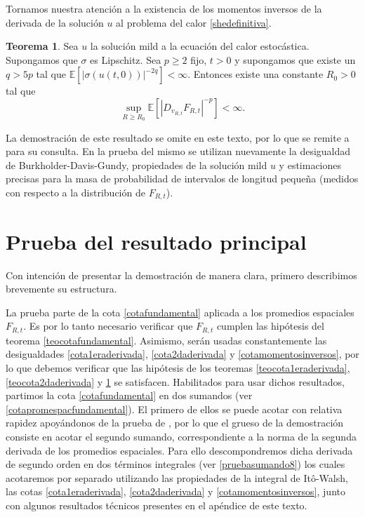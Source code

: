\documentclass[letterpaper,twoside,12pt]{book}
\newcommand{\E}{\mathbb{E}}
\newcommand{\1}{\mathds{1}}
\newcommand{\abs}[1]{\left\lvert #1 \right\rvert}
\theoremstyle{definition}
\theoremstyle{definition}
\newtheorem{teo}{Teorema}
\theoremstyle{remark}
\theoremstyle{definition}
\theoremstyle{definition}
\theoremstyle{definition}
\theoremstyle{definition}
\theoremstyle{definition}
\begin{document}
   Tornamos nuestra atención a la existencia de los momentos inversos de la derivada de la solución $u$ al problema del calor \eqref{shedefinitiva}.
\begin{teo}\label{teocotamomentosinversos}
   Sea $u$ la solución mild a la ecuación del calor estocástica. Supongamos que $\sigma$ es Lipschitz. Sea $p\geq2$ fijo, $t>0$ y supongamos que existe un $q>5p$ tal que $\E\left[\abs{\sigma(u(t,0))}^{-2q}\right]<\infty$. Entonces existe una constante $R_0>0$ tal que 
   \begin{equation}\label{cotamomentosinversos}
      \sup_{R\geq R_0}\E\left[\abs{D_{v_{R,t}}F_{R,t}}^{-p}\right]<\infty.
   \end{equation}
   
   \end{teo}
   La demostración de este resultado se omite en este texto, por lo que se remite a \cite[proposición 4.2]{KUZGUN202268} para su consulta. En la prueba del mismo se utilizan nuevamente la desigualdad de Burkholder-Davis-Gundy, propiedades de la solución mild $u$ y estimaciones precisas para la masa de probabilidad de intervalos de longitud pequeña (medidos con respecto a la distribución de $F_{R,t}$).

\section{Prueba del resultado principal}
Con intención de presentar la demostración de manera clara, primero describimos brevemente su estructura.

La prueba parte de la cota \eqref{cotafundamental} aplicada a los promedios espaciales $F_{R,t}$. Es por lo tanto necesario verificar que $F_{R,t}$ cumplen las hipótesis del teorema \ref{teocotafundamental}. Asimismo, serán usadas constantemente las desigualdades \eqref{cota1eraderivada}, \eqref{cota2daderivada} y \eqref{cotamomentosinversos}, por lo que debemos verificar que las hipótesis de los teoremas \ref{teocota1eraderivada}, \ref{teocota2daderivada} y \ref{teocotamomentosinversos} se satisfacen. Habilitados para usar dichos resultados, partimos la cota \eqref{cotafundamental} en dos sumandos (ver \eqref{cotapromespacfundamental}). El primero de ellos se puede acotar con relativa rapidez apoyándonos de la prueba de \cite[teorema 1.1]{HUANG20207170}, por lo que el grueso de la demostración consiste en acotar el segundo sumando, correspondiente a la norma de la segunda derivada de los promedios espaciales. Para ello descompondremos dicha derivada de segundo orden en dos términos integrales (ver \eqref{pruebasumando8}) los cuales acotaremos por separado utilizando las propiedades de la integral de Itô-Walsh, las cotas \eqref{cota1eraderivada}, \eqref{cota2daderivada} y \eqref{cotamomentosinversos}, junto con algunos resultados técnicos presentes en el apéndice de este texto.
\end{document}
